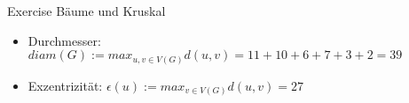 \begin{frame}[allowframebreaks]{Exercise \thesection}{Bäume und Kruskal}
\begin{solutionnoinc}
{\begin{minipage}[t]{18cm}
            \end{minipage}
        }
    \end{solutionnoinc}
    \begin{solutionnoinc}
    \end{solutionnoinc}
    \begin{solutionnoinc}
    \end{solutionnoinc}
    \begin{solutionnoinc}
    \end{solutionnoinc}
    \begin{solution}
    \end{solution}
    \begin{solution}
      \begin{itemize}
        \item \alert{Durchmesser:} $diam(G) := max_{u,v\in V(G)} d(u, v) = 11+10+6+7+3+2 = 39$
      \end{itemize}
    \end{solution}
    \begin{solutionnoinc}
      \begin{itemize}
        \item \alert{Exzentrizität:} $\epsilon(u) := max_{v\in V(G)} d(u,v) = 27$
      \end{itemize}
\end{solutionnoinc}
\end{frame}
